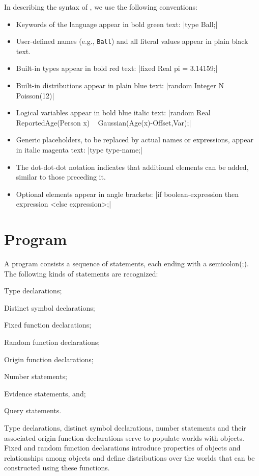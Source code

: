 \documentclass[12pt]{article}
\begin{document}
In describing the syntax of \bl, we use the following conventions:
\begin{itemize}
\item Keywords of the language appear in bold green text: \blog|type Ball;|
\item User-defined names (e.g., {\tt Ball}) and all literal values appear in plain black text.
\item Built-in types appear in bold red text: \blog|fixed Real pi = 3.14159;|
\item Built-in distributions appear in plain blue text: \blog|random Integer N ~ Poisson(12)|
\item Logical variables appear in bold blue italic text: \blog|random Real ReportedAge(Person x) ~ Gaussian(Age(x)-Offset,Var);|
\item Generic placeholders, to be replaced by actual names or expressions, appear in italic magenta text: \blog|type type-name;|
\item The dot-dot-dot notation indicates that additional elements can be added, similar to those preceding it.
\item Optional elements appear in angle brackets: \blog|if boolean-expression then expression <else expression>;|
\end{itemize}

\section{\bl Program}\label{program-section}\label{program-section}
A \bl program consists a sequence of statements, each ending with a semicolon(;). 
The following kinds of statements are recognized:
\begin{enumerate*}
\item Type declarations; 
\item Distinct symbol declarations;
\item Fixed function declarations;
\item Random function declarations;
\item Origin function declarations;
\item Number statements;
\item Evidence statements, and;
\item Query statements.
\end{enumerate*}

Type declarations, distinct symbol declarations, number statements and their associated origin function declarations serve to populate
worlds with objects. Fixed and random function declarations introduce properties of objects and relationships among objects
and define distributions over the worlds that can be constructed using these functions.
\end{document}
